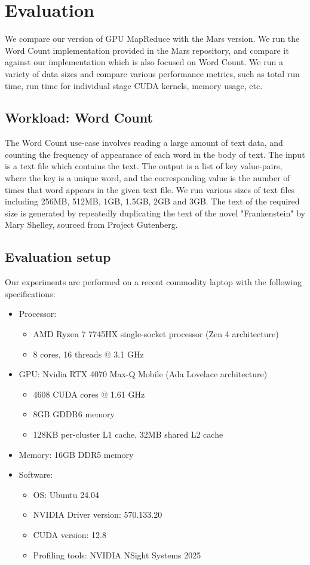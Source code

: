 \documentclass{article}
\begin{document}
\section{Evaluation}
We compare our version of GPU MapReduce with the Mars version. We run the Word Count implementation provided in the Mars repository, and compare it against our implementation which is also focused on Word Count. We run a variety of data sizes and compare various performance metrics, such as total run time, run time for individual stage CUDA kernels, memory usage, etc.

\subsection{Workload: Word Count}
The Word Count use-case involves reading a large amount of text data, and counting the frequency of appearance of each word in the body of text. The input is a text file which contains the text. The output is a list of key value-pairs, where the key is a unique word, and the corresponding value is the number of times that word appears in the given text file. We run various sizes of text files including 256MB, 512MB, 1GB, 1.5GB, 2GB and 3GB. The text of the required size is generated by repeatedly duplicating the text of the novel "Frankenstein" by Mary Shelley, sourced from Project Gutenberg.  

\subsection{Evaluation setup}
Our experiments are performed on a recent commodity laptop with the following specifications:
\begin{itemize}
    \item Processor: 
    \begin{itemize}
       \item AMD Ryzen 7 7745HX single-socket processor (Zen 4 architecture)
       \item 8 cores, 16 threads @ 3.1 GHz
    \end{itemize}
    \item GPU: Nvidia RTX 4070 Max-Q Mobile (Ada Lovelace architecture)
    \begin{itemize}
        \item 4608 CUDA cores @ 1.61 GHz
        \item 8GB GDDR6 memory
        \item 128KB per-cluster L1 cache, 32MB shared L2 cache
    \end{itemize}
    \item Memory: 16GB DDR5 memory
    \item Software:
    \begin{itemize}
        \item OS: Ubuntu 24.04
        \item NVIDIA Driver version: 570.133.20
        \item CUDA version: 12.8
        \item Profiling tools: NVIDIA NSight Systems 2025
    \end{itemize}
\end{itemize}
\end{document}
